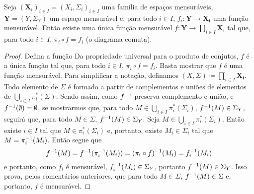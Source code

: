 \begin{prop}
Seja $(\bm X_i)_{i \in I} = (X_i,\Sigma_i)_{i \in I}$ uma família de espaços mensuráveis, $\bm Y = (Y,\Sigma_Y)$ um espaço mensurável e, para todo $i \in I$, $f_i: \bm Y \to \bm{X_i}$ uma função mensurável. Então existe uma única função mensurável $f: \bm Y \to \prod_{i \in I} \bm{X_i}$ tal que, para todo $i \in I$, $\pi_i \circ f = f_i$ (o diagrama comuta).
\begin{figure}
\centering
{}
\end{figure}
\end{prop}
\begin{proof}
Defina a função 
Da propriedade universal para o produto de conjutos, $f$ é a única função tal que, para todo $i \in I$, $\pi_i \circ f = f_i$. Basta mostrar que $f$ é uma função mensurável. Para simplificar a notação, definamos $(X,\Sigma) \coloneqq \prod_{i \in I} \bm{X_i}$. Todo elemento de $\Sigma$ é formado a partir de complementos e uniões de elementos de $\bigcup_{i \in I} \pi_i^*(\Sigma)$. Sendo assim, como $f^{-1}$ preserva complemento e união, e $f^{-1}(\emptyset)=\emptyset$, se mostrarmos que, para todo $M \in \bigcup_{i \in I} \pi_i^*(\Sigma_i)$, $f^{-1}(M) \in \Sigma_Y$, seguirá que, para todo $M \in \Sigma$, $f^{-1}(M) \in \Sigma_Y$. Seja $M \in \bigcup_{i \in I} \pi_i^*(\Sigma_i)$. Então existe $i \in I$ tal que $M \in \pi_i^*(\Sigma_i)$ e, portanto, existe $M_i \in \Sigma_i$ tal que $M=\pi_i^{-1}(M_i)$. Então segue que
	\begin{equation*}
	f^{-1}(M) = f^{-1}(\pi_i^{-1}(M_i)) = (\pi_i \circ f)^{-1}(M_i) = f_i^{-1}(M_i)
	\end{equation*}
e portanto, como $f_i$ é mensurável, $f_i^{-1}(M_i) \in \Sigma_Y$, portanto $f^{-1}(M) \in \Sigma_Y$. Isso prova, pelos comentários anteriores, que para todo $M \in \Sigma$, $f^{-1}(M) \in \Sigma$ e, portanto, $f$ é mensurável.
\end{proof}







\clearpage
